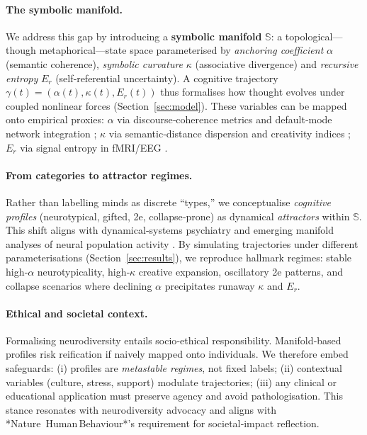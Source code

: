 \paragraph{The symbolic manifold.}
We address this gap by introducing a \textbf{symbolic manifold} $\mathbb{S}$: a topological---though metaphorical---state space parameterised by \emph{anchoring coefficient} $\alpha$ (semantic coherence), \emph{symbolic curvature} $\kappa$ (associative divergence) and \emph{recursive entropy} $E_r$ (self‑referential uncertainty). A cognitive trajectory $\gamma(t) = (\alpha(t),\kappa(t),E_r(t))$ thus formalises how thought evolves under coupled nonlinear forces (Section~\ref{sec:model}). These variables can be mapped onto empirical proxies: $\alpha$ via discourse‑coherence metrics and default‑mode network integration \cite{sporns2013network}; $\kappa$ via semantic‑distance dispersion and creativity indices \cite{beaty2016creative}; $E_r$ via signal entropy in fMRI/EEG \cite{carhart2014entropic,pillow2015entropy}.  

\paragraph{From categories to attractor regimes.}
Rather than labelling minds as discrete “types,” we conceptualise \emph{cognitive profiles} (neurotypical, gifted, 2e, collapse‑prone) as dynamical \emph{attractors} within $\mathbb{S}$. This shift aligns with dynamical‑systems psychiatry \cite{vandeleemput2014} and emerging manifold analyses of neural population activity \cite{langdon2023}. By simulating trajectories under different parameterisations (Section~\ref{sec:results}), we reproduce hallmark regimes: stable high‑$\alpha$ neurotypicality, high‑$\kappa$ creative expansion, oscillatory 2e patterns, and collapse scenarios where declining $\alpha$ precipitates runaway $\kappa$ and $E_r$.

\paragraph{Ethical and societal context.}
Formalising neurodiversity entails socio‑ethical responsibility. Manifold‑based profiles risk reification if naively mapped onto individuals. We therefore embed safeguards: (i) profiles are \emph{metastable regimes}, not fixed labels; (ii) contextual variables (culture, stress, support) modulate trajectories; (iii) any clinical or educational application must preserve agency and avoid pathologisation. This stance resonates with neurodiversity advocacy \cite{silberman2015neurodiversity} and aligns with *Nature Human Behaviour*’s requirement for societal‑impact reflection.

